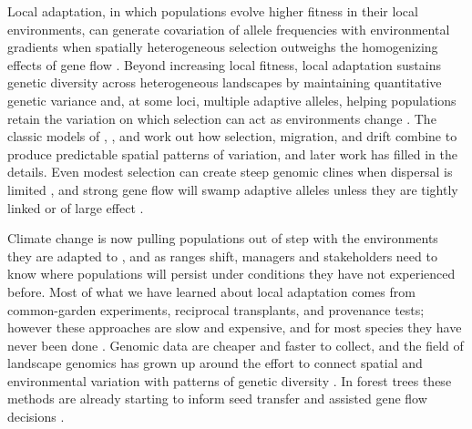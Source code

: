 \documentclass[]{article}
\begin{document}
Local adaptation, in which populations evolve higher fitness in their local environments, 
can generate covariation of allele frequencies with environmental gradients 
when spatially heterogeneous selection outweighs the homogenizing effects of gene flow
\citep{savolainen_ecological_2013, lenormand_gene_2002}.
Beyond increasing local fitness,
local adaptation sustains genetic diversity across heterogeneous landscapes
by maintaining quantitative genetic variance and, at some loci, multiple adaptive alleles,
helping populations retain the variation
on which selection can act as environments change \citep{hereford_quantitative_2009}.
The classic models of 
\citet{wright_isolation_1943}, 
\citet{levene_genetic_1953},
and 
\citet{endler1977geographic}
work out how selection, migration, and drift
combine to produce predictable spatial patterns of variation,
and later work has filled in the details.
Even modest selection can create steep genomic clines
when dispersal is limited
\citep{tigano_genomics_2016, yeaman_genetic_2011},
and strong gene flow will swamp adaptive alleles
unless they are tightly linked or of large effect
\citep{slatkin_gene_1975}.

Climate change is now pulling populations out of step
with the environments they are adapted to \citep{lee_ipcc_2023},
and as ranges shift, managers and stakeholders need to know
where populations will persist under conditions
they have not experienced before.
Most of what we have learned about local adaptation comes from
common-garden experiments, reciprocal transplants,
and provenance tests; however these approaches are slow and expensive,
and for most species they have never been done
\citep{aitken_assisted_2013}.
Genomic data are cheaper and faster to collect,
and the field of landscape genomics has grown up around
the effort to connect spatial and environmental variation
with patterns of genetic diversity
\citep{manel_landscape_2003, rellstab_practical_2015}.
In forest trees these methods are already starting to inform
seed transfer and assisted gene flow decisions
\citep{aitken_bemmels_2016}.
\end{document}
